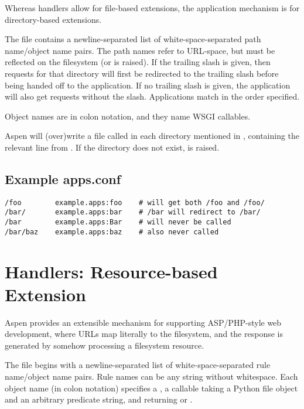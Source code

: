 Whereas handlers allow for file-based extensions, the application mechanism is
for directory-based extensions.

The  file contains a newline-separated list of
white-space-separated path name/object name pairs. The path names refer to
URL-space, but must be reflected on the filesystem (or  is
raised). If the trailing slash is given, then requests for that directory will
first be redirected to the trailing slash before being handed off to the
application. If no trailing slash is given, the application will also get
requests without the slash. Applications match in the order specified.

Object names are in colon notation, and they name WSGI callables.

Aspen will (over)write a file called  in each directory
mentioned in , containing the relevant line from
. If the directory does not exist,  is
raised.


\subsection{Example apps.conf \label{apps.conf}}

\begin{verbatim}
/foo        example.apps:foo    # will get both /foo and /foo/
/bar/       example.apps:bar    # /bar will redirect to /bar/
/bar        example.apps:Bar    # will never be called
/bar/baz    example.apps:baz    # also never called
\end{verbatim}


\section{Handlers: Resource-based Extension \label{handlers}}

Aspen provides an extensible mechanism for supporting ASP/PHP-style web
development, where URLs map literally to the filesystem, and the response is
generated by somehow processing a filesystem resource.

The  file begins with a newline-separated list of
white-space-separated rule name/object name pairs. Rule names can be any string
without whitespace. Each object name (in colon notation) specifies a ,
a callable taking a Python file object and an arbitrary predicate string, and
returning  or .

